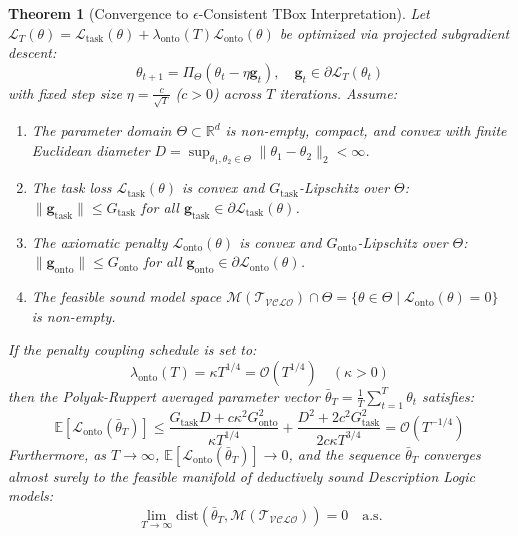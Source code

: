 \documentclass[11pt,a4paper]{article}
\newtheorem{theorem}{Theorem}
\begin{document}
\begin{theorem}[Convergence to $\epsilon$-Consistent TBox Interpretation]
\label{thm:convergence}
Let $\mathcal{L}_T(\theta) = \mathcal{L}_{\text{task}}(\theta) + \lambda_{\text{onto}}(T) \mathcal{L}_{\text{onto}}(\theta)$ be optimized via projected subgradient descent:
\begin{equation}
\theta_{t+1} = \Pi_\Theta\left( \theta_t - \eta \mathbf{g}_t \right), \quad \mathbf{g}_t \in \partial \mathcal{L}_T(\theta_t)
\end{equation}
with fixed step size $\eta = \frac{c}{\sqrt{T}}$ ($c > 0$) across $T$ iterations. Assume:
\begin{enumerate}[label=(\roman*)]
    \item The parameter domain $\Theta \subset \mathbb{R}^d$ is non-empty, compact, and convex with finite Euclidean diameter $D = \sup_{\theta_1, \theta_2 \in \Theta} \|\theta_1 - \theta_2\|_2 < \infty$.
    \item The task loss $\mathcal{L}_{\text{task}}(\theta)$ is convex and $G_{\text{task}}$-Lipschitz over $\Theta$: $\|\mathbf{g}_{\text{task}}\| \le G_{\text{task}}$ for all $\mathbf{g}_{\text{task}} \in \partial \mathcal{L}_{\text{task}}(\theta)$.
    \item The axiomatic penalty $\mathcal{L}_{\text{onto}}(\theta)$ is convex and $G_{\text{onto}}$-Lipschitz over $\Theta$: $\|\mathbf{g}_{\text{onto}}\| \le G_{\text{onto}}$ for all $\mathbf{g}_{\text{onto}} \in \partial \mathcal{L}_{\text{onto}}(\theta)$.
    \item The feasible sound model space $\mathcal{M}(\mathcal{T}_{\mathcal{VCLO}}) \cap \Theta = \{ \theta \in \Theta \mid \mathcal{L}_{\text{onto}}(\theta) = 0 \}$ is non-empty.
\end{enumerate}
If the penalty coupling schedule is set to:
\begin{equation}
\label{eq:coupling_schedule}
\lambda_{\text{onto}}(T) = \kappa T^{1/4} = \mathcal{O}(T^{1/4}) \quad (\kappa > 0)
\end{equation}
then the Polyak-Ruppert averaged parameter vector $\bar{\theta}_T = \frac{1}{T} \sum_{t=1}^T \theta_t$ satisfies:
\begin{equation}
\label{eq:thm1_convergence_bound}
\mathbb{E}\left[ \mathcal{L}_{\text{onto}}(\bar{\theta}_T) \right] \le \frac{G_{\text{task}} D + c \kappa^2 G_{\text{onto}}^2}{\kappa T^{1/4}} + \frac{D^2 + 2 c^2 G_{\text{task}}^2}{2 c \kappa T^{3/4}} = \mathcal{O}\left( T^{-1/4} \right)
\end{equation}
Furthermore, as $T \to \infty$, $\mathbb{E}[\mathcal{L}_{\text{onto}}(\bar{\theta}_T)] \to 0$, and the sequence $\bar{\theta}_T$ converges almost surely to the feasible manifold of deductively sound Description Logic models:
\begin{equation}
\lim_{T \to \infty} \mathrm{dist}\left( \bar{\theta}_T, \mathcal{M}(\mathcal{T}_{\mathcal{VCLO}}) \right) = 0 \quad \text{a.s.}
\end{equation}
\end{theorem}
\end{document}
